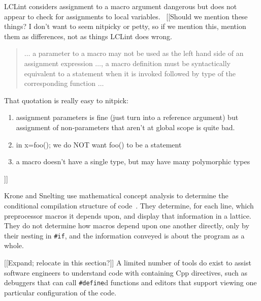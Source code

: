 \documentclass[10pt]{article}
\begin{document}
LCLint
considers assignment to a macro argument dangerous but does not appear
to check for assignments to local variables.~\cite[\section 8]{Evans:LCLint}
[[Should we mention these things?  I don't want to seem nitpicky or petty, so
if we mention this, mention them as differences, not as things LCLint does
wrong.
\begin{quote}
$\ldots$ a parameter to a macro may not be used as the left hand side
of an assignment expression $\ldots$, a macro definition must be
syntactically equivalent to a statement when it is invoked followed by
type of the corresponding function $\ldots$~\cite[\section 8]{Evans:LCLint}
\end{quote}
That quotation is really easy to nitpick:
\begin{enumerate}
 \item assignment parameters is fine (just turn into a reference argument) but
    assignment of non-parameters that aren't at global scope is quite bad.
 \item in x=foo(); we do NOT want foo() to be a statement
 \item a macro doesn't have a single type, but may have many polymorphic types
\end{enumerate}
]]



Krone and Snelting use mathematical concept analysis to determine the
conditional compilation structure of code~\cite{Krone94}.  They determine,
for each line, which preprocessor macros it depends upon, and display that
information in a lattice.  They do not determine how macros depend upon one
another directly, only by their nesting in {\tt \#if}, and the information
conveyed is about the program as a whole.


[[Expand; relocate in this section?]]
A limited number of tools do exist to assist software engineers to
understand code with containing Cpp directives, such as debuggers that can
call {\tt \#define}d functions and editors that support viewing one
particular configuration of the code.
\end{document}
